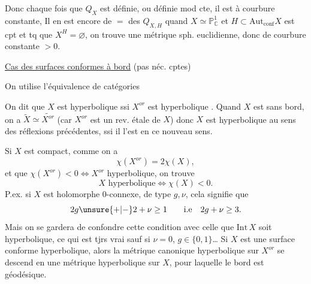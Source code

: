 Donc chaque fois que $Q_X$ est définie, ou définie mod cte, il est à courbure constante,  Il en est encore de $=$ des $Q_{X,H}$ quand $X\simeq\mathbb P^1_{\mathbb C}$ et $H\subset\mathrm{Aut}_{\mathrm{conf}}X$ est cpt et tq que $X^H=\varnothing$, on trouve une métrique sph. euclidienne, donc de courbure constante $>0$.

\uline{Cas des surfaces conformes à bord} (pas néc. cptes)

On utilise l'équivalence de catégories

On dit que $X$ est hyperbolique ssi $X^{or}$ est hyperbolique . Quand $X$ est sans bord, on a $\widetilde X\simeq\widetilde{X^{or}}$ (car $X^{or}$ est un rev. étale de $X$) donc $X$ est hyperbolique au sens des réflexions précédentes, ssi il l'est en ce nouveau sens.

Si $X$ est compact,  comme on a
\[
\chi(X^{or})=2\chi(X),
\]
et que $\chi(X^{or})<0\Longleftrightarrow X^{or}$ hyperbolique, on trouve
\[
X\text{ hyperbolique}\Longleftrightarrow\chi(X)<0.
\]
P.ex. si $X$ est holomorphe 0-connexe, de type $g,\nu$, cela signifie que
\[
2g\unsure{+|-}2+\nu\geq1\qquad\text{i.e}\quad2g+\nu\geq3.
\]
Mais on se gardera de confondre cette condition avec celle que $\mathrm{Int}\,X$ soit hyperbolique, ce qui est tjrs vrai sauf si $\nu=0$, $g\in\{0,1\}$\ldots
{}
Si $X$ est une surface conforme hyperbolique, alors la métrique canonique hyperbolique sur $X^{or}$ se descend en une métrique hyperbolique sur $X$, pour laquelle le bord est géodésique.

